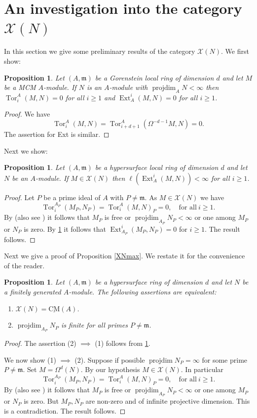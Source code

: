 \documentclass{amsart}
\newcommand{\m}{\mathfrak{m} }
\newcommand{\X}{\mathcal{X} }
\newcommand{\projdim}{\operatorname{projdim}}
\newcommand{\Tor}{\operatorname{Tor}}
\newcommand{\CMS}{\operatorname{\underline{CM}}}
\newcommand{\Ext}{\operatorname{Ext}}
\theoremstyle{plain}
\newtheorem{proposition}[theorem]{Proposition}
\theoremstyle{definition}
\theoremstyle{remark}
\begin{document}
\section{An investigation into the category $\X(N)$}
In this section we give some preliminary results of the category $\X(N)$. We first show:
\begin{proposition}\label{pdimf}
Let $(A, \m)$ be a Gorenstein local ring of dimension $d$  and let $M$ be a MCM $A$-module. If $N$ is an $A$-module with $\projdim_A N < \infty$ then \\ $\Tor^A_i(M, N) = 0$ for all $ i \geq 1$ and $\Ext_A^i(M, N) = 0$ for all $ i \geq 1$.
\end{proposition}
\begin{proof}
We have
$$ \Tor^A_i(M, N) = \Tor^A_{i + d + 1}(\Omega^{-d -1}M, N) = 0.$$
The assertion for Ext is similar.
\end{proof}
Next we show:
\begin{proposition}\label{ext-x}
Let $(A, \m)$ be a hypersurface local ring of dimension $d$  and let $N$ be an $A$-module.
If $M \in \X(N)$ then $\ell(\Ext^i_A(M, N)) < \infty $ for all $i \geq 1$.
\end{proposition}
\begin{proof}
Let $P$ be a prime ideal of $A$ with $P \neq \m$. As $M \in \X(N)$ we have
$$\Tor^{A_P}_i(M_P, N_P) = \Tor^A_i(M, N)_P = 0,  \quad \text{for all} \ i \geq 1. $$
By \cite[1.9]{HW} (also see \cite[1.1]{M})  it follows that $M_P$ is free or $\projdim_{A_P} N_P < \infty$ or one among $M_P$ or $N_P$ is zero. By \ref{pdimf} it follows that $\Ext_{A_P}^i(M_P, N_P) = 0$ for $i \geq 1$.
The result follows.
\end{proof}
Next we give a proof of Proposition \ref{XNmax}. We restate it for the convenience of the reader.
\begin{proposition}\label{XNmax-body}
Let $(A, \m)$ be a hypersurface ring of dimension $d$ and let $N$ be a finitely generated $A$-module. The following assertions are equivalent:
\begin{enumerate}[\rm (1)]
  \item $\X(N) = \CMS(A)$.
  \item $\projdim_{A_P} N_P$ is finite for all primes $P \neq \m$.
\end{enumerate}
\end{proposition}
\begin{proof}
The assertion (2) $\implies $ (1) follows from \ref{pdimf}.

We now show (1) $\implies $ (2). Suppose if possible $\projdim N_P = \infty $ for some prime $P \neq \m$. Set $M = \Omega^{d}(N)$. By our hypothesis $M \in \X(N)$. In particular
$$\Tor^{A_P}_i(M_P, N_P) = \Tor^A_i(M, N)_P = 0,  \quad \text{for all} \ i \geq 1. $$
By \cite[1.9]{HW} (also see \cite[1.1]{M}) it follows that $M_P$ is free or $\projdim_{A_P} N_P < \infty$ or one among $M_P$ or $N_P$ is zero. But $M_P, N_P$ are non-zero and of infinite projective dimension. This is a contradiction. The result follows.
\end{proof}
\end{document}

